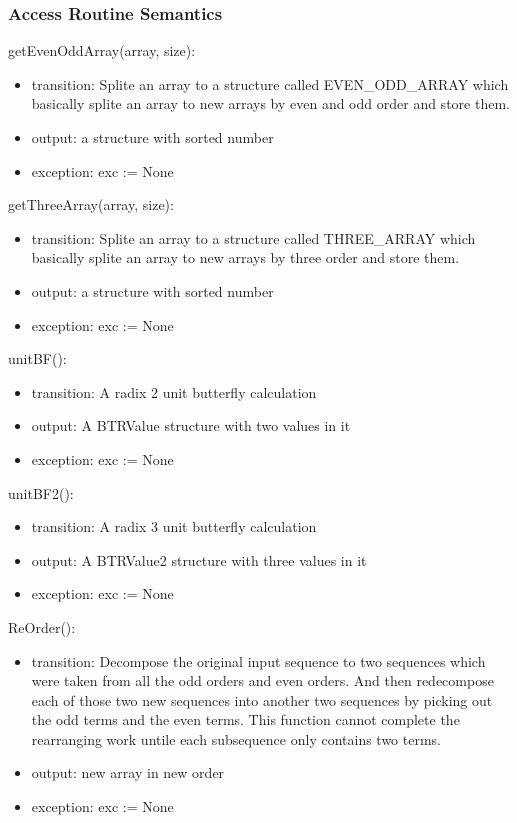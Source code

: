 \documentclass[12pt, titlepage]{article}
\begin{document}
\subsubsection{Access Routine Semantics}
getEvenOddArray(array, size):
\begin{itemize}
\item transition: Splite an array to a structure called EVEN\_ODD\_ARRAY which basically splite an array to new arrays by even and odd order and store them.
\item output:  a structure with sorted number
\item exception: exc := None
\end{itemize}
getThreeArray(array, size):
\begin{itemize}
\item transition: Splite an array to a structure called THREE\_ARRAY which basically splite an array to new arrays by three order and store them.
\item output:  a structure with sorted number
\item exception: exc := None
\end{itemize}
unitBF():
\begin{itemize}
\item transition: A radix 2 unit butterfly calculation
\item output:  A BTRValue structure with two values in it
\item exception: exc := None
\end{itemize}
unitBF2():
\begin{itemize}
\item transition: A radix 3 unit butterfly calculation
\item output:  A BTRValue2  structure with three values in it
\item exception: exc := None
\end{itemize}
ReOrder():
\begin{itemize}
\item transition:  Decompose the original input sequence to two sequences which were taken from all the odd orders and even orders.
And then redecompose each of those two new sequences into another  two sequences by picking out the odd terms and the even terms.
This function cannot complete the rearranging work untile each subsequence only contains two terms.\\
\item output:  new array in new order
\item exception: exc := None
\end{itemize}
\end{document}
